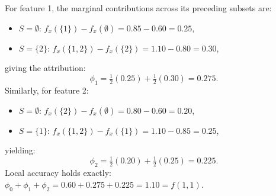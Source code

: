 For feature 1, the marginal contributions across its preceding subsets are:
\begin{itemize}[leftmargin=1.2em, itemsep=0.5pt, topsep=1pt]
    \item $S = \emptyset$: $f_x(\{1\}) - f_x(\emptyset) = 0.85 - 0.60 = 0.25$,
    \item $S = \{2\}$: $f_x(\{1, 2\}) - f_x(\{2\}) = 1.10 - 0.80 = 0.30$,
\end{itemize}
giving the attribution:
\begin{equation}
    \phi_1 = \tfrac{1}{2}(0.25) + \tfrac{1}{2}(0.30) = 0.275 .
\end{equation}
Similarly, for feature 2:
\begin{itemize}[leftmargin=1.2em, itemsep=0.5pt, topsep=1pt]
    \item $S = \emptyset$: $f_x(\{2\}) - f_x(\emptyset) = 0.80 - 0.60 = 0.20$,
    \item $S = \{1\}$: $f_x(\{1, 2\}) - f_x(\{1\}) = 1.10 - 0.85 = 0.25$,
\end{itemize}
yielding:
\begin{equation}
    \phi_2 = \tfrac{1}{2}(0.20) + \tfrac{1}{2}(0.25) = 0.225 .
\end{equation}
Local accuracy holds exactly: $\phi_0 + \phi_1 + \phi_2 = 0.60 + 0.275 + 0.225 = 1.10 = f(1, 1)$.

